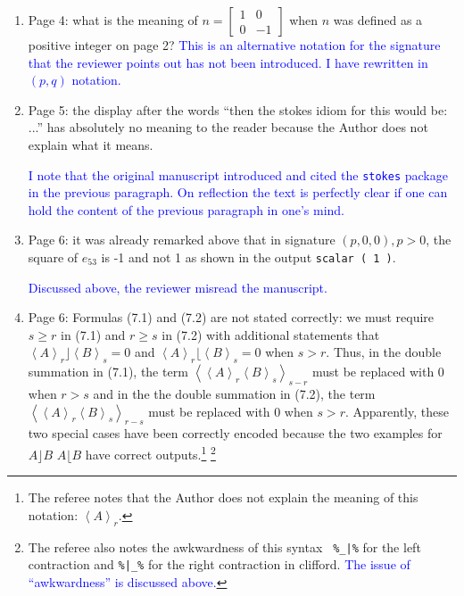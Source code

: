 \documentclass{article}
\begin{document}
\begin{enumerate}
\item Page 4: what is the meaning of
  $n=\left[\begin{array}{cc}1&0\\0&-1\end{array}\right]$ when $n$ was
  defined as a positive integer on page 2?  \textcolor{blue}{This is
    an alternative notation for the signature that the reviewer points
    out has not been introduced.  I have rewritten in $(p,q)$
    notation.}
  
  \item Page 5: the display after the words
“then the stokes idiom for this would be: ...” has absolutely no
meaning to the reader because the Author does not explain what it
means.

\textcolor{blue}{I note that the original manuscript introduced and
  cited the {\tt stokes} package in the previous paragraph.  On
  reflection the text is perfectly clear if one can hold the content
  of the previous paragraph in one's mind.}

\item Page 6: it was already remarked above that in signature $(p, 0,
  0), p > 0$, the square of $e_{53}$ is -1 and not 1 as shown in the
  output \verb+scalar ( 1 )+.

\textcolor{blue}{Discussed above, the reviewer misread the
  manuscript.}

  \item Page 6: Formulas (7.1) and (7.2) are not stated correctly: we
    must require $s\geq r$ in (7.1) and $r \geq s$ in (7.2) with
    additional statements that $\left\langle
    A\right\rangle_r\rfloor\left\langle B\right\rangle_s=0$ and
    $\left\langle A\right\rangle_r\lfloor\left\langle
    B\right\rangle_s=0$ when $s > r$.  Thus, in the double summation
    in (7.1), the term $\left\langle\left\langle
    A\right\rangle_r\left\langle B\right\rangle_s\right\rangle_{s-r}$
    must be replaced with 0 when $r > s$ and in the the double
    summation in (7.2), the term $\left\langle\left\langle
    A\right\rangle_r\left\langle B\right\rangle_s\right\rangle_{r-s}$
    must be replaced with 0 when $s>r$. Apparently, these two special
    cases have been correctly encoded because the two examples for
    $A\rfloor B$ $A\lfloor B$ have correct outputs.\footnote{The referee notes that the Author does not explain the
meaning of this notation: $\left\langle A\right\rangle_r$.}
\footnote{The referee also notes the awkwardness of this syntax {\tt
  \%\_|\%} for the left contraction and {\tt \%|\_\%} for the right
contraction in clifford.\textcolor{blue}{ The issue of ``awkwardness''
  is discussed above.}}


\end{enumerate}
\end{document}
